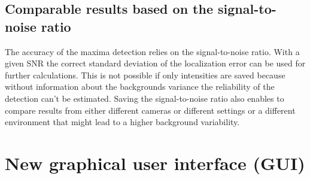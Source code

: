 \subsection{Comparable results based on the signal-to-noise ratio}
The accuracy of the maxima detection relies on the signal-to-noise ratio. With a given SNR the correct standard deviation of the localization error can be used for further calculations. This is not possible if only intensities are saved because without information about the backgrounds variance the reliability of the detection can't be estimated.\newline
Saving the signal-to-noise ratio also enables to compare results from either different cameras or different settings or a different environment that might lead to a higher background variability.  


\section{New graphical user interface (GUI)}
